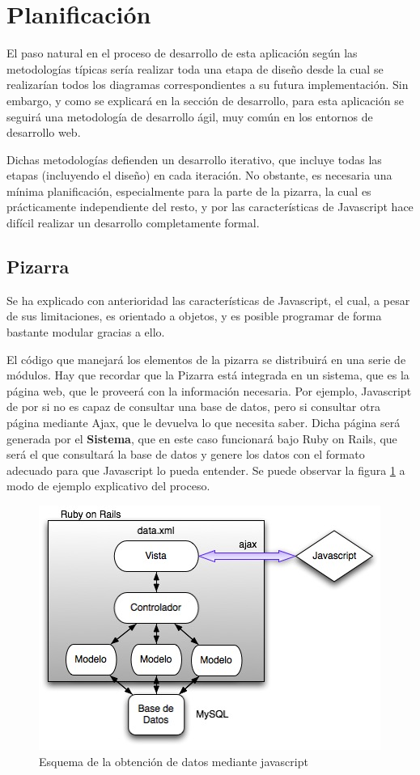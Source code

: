 
\section{Planificación} %
\label{sec:planificacion}
El paso natural en el proceso de desarrollo de esta aplicación según las metodologías típicas sería realizar toda una etapa de diseño desde la cual se realizarían todos los diagramas correspondientes a su futura implementación. Sin embargo, y como se explicará en la sección de desarrollo, para esta aplicación se seguirá una metodología de desarrollo ágil, muy común en los entornos de desarrollo web.

Dichas metodologías defienden un desarrollo iterativo, que incluye todas las etapas (incluyendo el diseño) en cada iteración. No obstante, es necesaria una mínima planificación, especialmente para la parte de la pizarra, la cual es prácticamente independiente del resto, y por las características de Javascript hace difícil realizar un desarrollo completamente formal.

\subsection{Pizarra}
Se ha explicado con anterioridad las características de Javascript, el cual, a pesar de sus limitaciones, es orientado a objetos, y es posible programar de forma bastante modular gracias a ello. 

El código que manejará los elementos de la pizarra se distribuirá en una serie de módulos. Hay que recordar que la Pizarra está integrada en un sistema, que es la página web, que le proveerá con la información necesaria. Por ejemplo, Javascript de por si no es capaz de consultar una base de datos, pero si consultar otra página mediante Ajax, que le devuelva lo que necesita saber. Dicha página será generada por el \textbf{Sistema}, que en este caso funcionará bajo Ruby on Rails, que será el que consultará la base de datos y genere los datos con el formato adecuado para que Javascript lo pueda entender. Se puede observar la figura \ref{fig:javascript-data} a modo de ejemplo explicativo del proceso.

\begin{figure}[h]
\centering
\includegraphics{javascript-data.jpg}
\caption{Esquema de la obtención de datos mediante javascript}\label{fig:javascript-data}
\end{figure}


